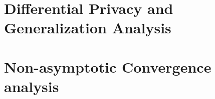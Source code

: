 \documentclass[11pt]{article}
\begin{document}
\section{Differential Privacy and Generalization Analysis} \label{sec: pri}



\vspace{0.2in}

\section{Non-asymptotic Convergence analysis}


\vspace{0.2in}

% 

%

%
\end{document}
